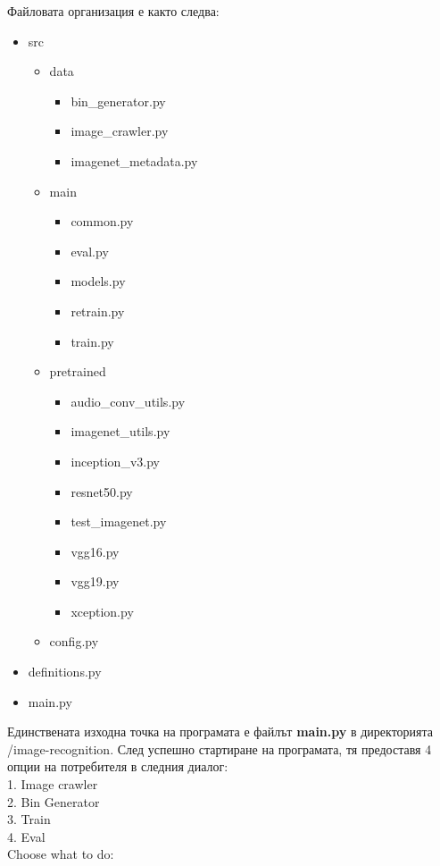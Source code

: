 Файловата организация е както следва:

\begin{itemize}
\item src
	\begin{itemize}
      \item data
      	\begin{itemize}
          \item bin\_generator.py
          \item image\_crawler.py
          \item imagenet\_metadata.py
        \end{itemize}
      \item main
      	\begin{itemize}
          \item common.py
          \item eval.py
          \item models.py
          \item retrain.py
          \item train.py
        \end{itemize}
      \item pretrained
      	\begin{itemize}
          \item audio\_conv\_utils.py
          \item imagenet\_utils.py
          \item inception\_v3.py
          \item resnet50.py
          \item test\_imagenet.py
          \item vgg16.py
          \item vgg19.py
          \item xception.py
        \end{itemize}
      \item config.py
    \end{itemize}
\item definitions.py
\item main.py
\end{itemize}


Единствената изходна точка на програмата е файлът \textbf{main.py} в директорията /image-recognition. След успешно стартиране на програмата, тя предоставя 4 опции на потребителя в следния диалог:\\
1. Image crawler\\
2. Bin Generator\\
3. Train\\
4. Eval\\
Choose what to do:

